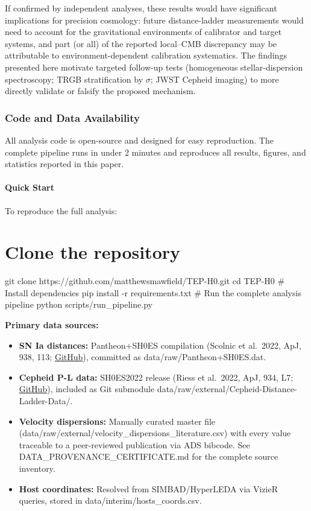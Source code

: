 \documentclass[
]{article}
\begin{document}
If confirmed by independent analyses, these results would have
significant implications for precision cosmology: future distance-ladder
measurements would need to account for the gravitational environments of
calibrator and target systems, and part (or all) of the reported
local--CMB discrepancy may be attributable to environment-dependent
calibration systematics. The findings presented here motivate targeted
follow-up tests (homogeneous stellar-dispersion spectroscopy; TRGB
stratification by \(\sigma\); JWST Cepheid imaging) to more directly
validate or falsify the proposed mechanism.

\begin{quote}
\end{quote}

\subsubsection{Code and Data
Availability}\label{code-and-data-availability}

All analysis code is open-source and designed for easy reproduction. The
complete pipeline runs in under 2 minutes and reproduces all results,
figures, and statistics reported in this paper.

\paragraph{Quick Start}\label{quick-start}

To reproduce the full analysis:

\section{Clone the repository}\label{clone-the-repository}

git clone https://github.com/matthewsmawfield/TEP-H0.git cd TEP-H0 \#
Install dependencies pip install -r requirements.txt \# Run the complete
analysis pipeline python scripts/run\_pipeline.py

\textbf{Primary data sources:}

\begin{itemize}
\item
  \textbf{SN Ia distances:} Pantheon+SH0ES compilation (Scolnic et
  al.~2022, ApJ, 938, 113;
  \href{https://github.com/PantheonPlusSH0ES/DataRelease}{GitHub}),
  committed as data/raw/Pantheon+SH0ES.dat.
\item
  \textbf{Cepheid P-L data:} SH0ES2022 release (Riess et al.~2022, ApJ,
  934, L7;
  \href{https://github.com/marcushogas/Cepheid-Distance-Ladder-Data}{GitHub}),
  included as Git submodule
  data/raw/external/Cepheid-Distance-Ladder-Data/.
\item
  \textbf{Velocity dispersions:} Manually curated master file
  (data/raw/external/velocity\_dispersions\_literature.csv) with every
  value traceable to a peer-reviewed publication via ADS bibcode. See
  DATA\_PROVENANCE\_CERTIFICATE.md for the complete source inventory.
\item
  \textbf{Host coordinates:} Resolved from SIMBAD/HyperLEDA via VizieR
  queries, stored in data/interim/hosts\_coords.csv.
\end{itemize}
\end{document}
